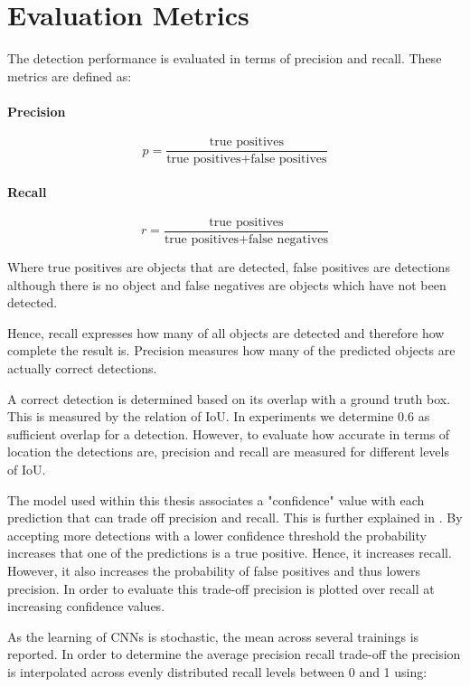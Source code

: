 \section{Evaluation Metrics}

The detection performance is evaluated in terms of precision and recall. These metrics are defined as:

\paragraph{Precision}
$$p = \frac{\text{true positives}}{\text{true positives} + \text{false positives}}$$

\paragraph{Recall}
$$r = \frac{\text{true positives}}{\text{true positives} + \text{false negatives}}$$

Where true positives are objects that are detected, false positives are detections although there is no object and false negatives are objects which have not been detected.

Hence, recall expresses how many of all objects are detected and therefore how complete the result is. Precision measures how many of the predicted objects are actually correct detections.

A correct detection is determined based on its overlap with a ground truth box. This is measured by the relation of \ac{IoU}. In experiments we determine 0.6 as sufficient overlap for a detection. However, to evaluate how accurate in terms of location the detections are, precision and recall are measured for different levels of \ac{IoU}.

The model used within this thesis associates a "confidence" value with each prediction that can trade off precision and recall. This is further explained in . By accepting more detections with a lower confidence threshold the probability increases that one of the predictions is a true positive. Hence, it increases recall. However, it also increases the probability of false positives and thus lowers precision. In order to evaluate this trade-off precision is plotted over recall at increasing confidence values.

As the learning of \acp{CNN} is stochastic, the mean across several trainings is reported. In order to determine the average precision recall trade-off the precision is interpolated across evenly distributed recall levels between 0 and 1 using:

